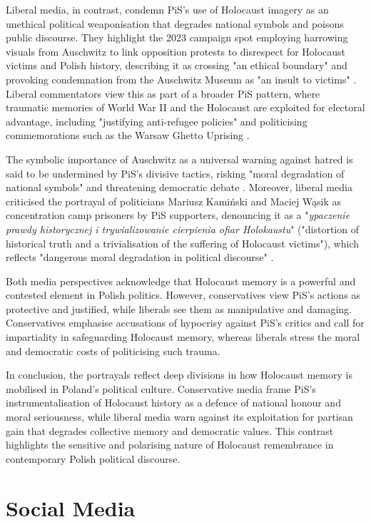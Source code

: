 Liberal media, in contrast, condemn PiS's use of Holocaust imagery as an unethical political weaponisation that degrades national symbols and poisons public discourse. They highlight the 2023 campaign spot employing harrowing visuals from Auschwitz to link opposition protests to disrespect for Holocaust victims and Polish history, describing it as crossing "an ethical boundary" and provoking condemnation from the Auschwitz Museum as "an insult to victims" \citep{kondzinska_spot_2023}. Liberal commentators view this as part of a broader PiS pattern, where traumatic memories of World War II and the Holocaust are exploited for electoral advantage, including "justifying anti-refugee policies" and politicising commemorations such as the Warsaw Ghetto Uprising \citep{wielinski_pis_2023}.

The symbolic importance of Auschwitz as a universal warning against hatred is said to be undermined by PiS's divisive tactics, risking "moral degradation of national symbols" and threatening democratic debate \citep{kondzinska_spot_2023}. Moreover, liberal media criticised the portrayal of politicians Mariusz Kamiński and Maciej Wąsik as concentration camp prisoners by PiS supporters, denouncing it as a "\textit{ypaczenie prawdy historycznej i trywializowanie cierpienia ofiar Holokaustu}" ("distortion of historical truth and a trivialisation of the suffering of Holocaust victims"), which reflects "dangerous moral degradation in political discourse" \citep{wantuch_przy_2023}.

Both media perspectives acknowledge that Holocaust memory is a powerful and contested element in Polish politics. However, conservatives view PiS's actions as protective and justified, while liberals see them as manipulative and damaging. Conservatives emphasise accusations of hypocrisy against PiS's critics and call for impartiality in safeguarding Holocaust memory, whereas liberals stress the moral and democratic costs of politicising such trauma.

In conclusion, the portrayals reflect deep divisions in how Holocaust memory is mobilised in Poland's political culture. Conservative media frame PiS's instrumentalisation of Holocaust history as a defence of national honour and moral seriousness, while liberal media warn against its exploitation for partisan gain that degrades collective memory and democratic values. This contrast highlights the sensitive and polarising nature of Holocaust remembrance in contemporary Polish political discourse.

\section{Social Media}
\label{sec:social_media}

